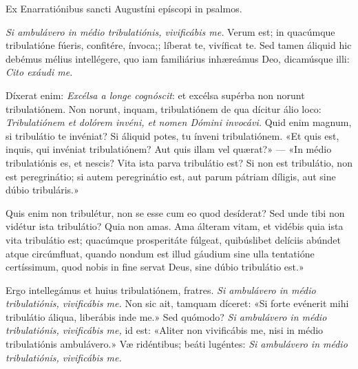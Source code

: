 {

\noindent Ex Enarratiónibus sancti Augustíni epíscopi in psalmos.

\noindent \emph{Si ambulávero in médio tribulatiónis, vivificábis me.} Verum est; in quacúmque tribulatióne fúeris, confitére, ínvoca;; líberat te, vivíficat te. Sed tamen áliquid hic debémus mélius intellégere, quo iam familiárius inhæreámus Deo, dicamúsque illi: \emph{Cito exáudi me.}

\noindent Díxerat enim: \emph{Excélsa a longe cognóscit}: et excélsa supérba non norunt tribulatiónem. Non norunt, inquam, tribulatiónem de qua dícitur álio loco: \emph{Tribulatiónem et dolórem invéni, et nomen Dómini invocávi.} Quid enim magnum, si tribulátio te invéniat? Si áliquid potes, tu ínveni tribulatiónem. «Et quis est, inquis, qui invéniat tribulatiónem? Aut quis illam vel quærat?» — «In médio tribulatiónis es, et nescis? Vita ista parva tribulátio est? Si non est tribulátio, non est peregrinátio; si autem peregrinátio est, aut parum pátriam díligis, aut sine dúbio tribuláris.»

\noindent Quis enim non tribulétur, non se esse cum eo quod desíderat? Sed unde tibi non vidétur ista tribulátio? Quia non amas. Ama álteram vitam, et vidébis quia ista vita tribulátio est; quacúmque prosperitáte fúlgeat, quibúslibet delíciis abúndet atque circúmfluat, quando nondum est illud gáudium sine ulla tentatióne certíssimum, quod nobis in fine servat Deus, sine dúbio tribulátio est.»

\noindent Ergo intellegámus et huius tribulatiónem, fratres. \emph{Si ambulávero in médio tribulatiónis, vivificábis me.} Non sic ait, tamquam díceret: «Si forte evénerit mihi tribulátio áliqua, liberábis inde me.» Sed quómodo? \emph{Si ambulávero in médio tribulatiónis, vivificábis me,} id est: «Aliter non vivificábis me, nisi in médio tribulatiónis ambulávero.» Væ ridéntibus; beáti lugéntes: \emph{Si ambulávero in médio tribulatiónis, vivificábis me.}

\vfill
\pagebreak

 

\vspace{-5mm}


\vfill
\pagebreak
}
\newcommand{\hymnuslaudes}{\pars{Hymnus} \scriptura{Alcuinus (\olddag{} 804)}

\cuminitiali{IV}{temporalia/hym-EcceIam.gtex}}
